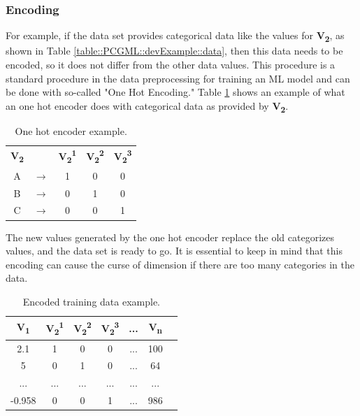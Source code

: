 \documentclass[MGS,Master,english]{twbook}%
\begin{document}
\subsubsection{Encoding}
For example, if the data set provides categorical data like the values for \textbf{V\textsubscript{2}}, as shown in Table \ref{table::PCGML::devExample::data}, then this data needs to be encoded, so it does not differ from the other data values. This procedure is a standard procedure in the data preprocessing for training an ML model and can be done with so-called "One Hot Encoding." Table \ref{table::PCGML::devExample::oneHotEncoder} shows an example of what an one hot encoder does with categorical data as provided by \textbf{V\textsubscript{2}}. 
\begin{table}[!ht]
	\centering
	\begin{tabular}{|c|c|c|c|c|}
		\cline{1-1} \cline{3-5}
		\textbf{V\textsubscript{2}} &  & \textbf{V\textsubscript{2}\textsuperscript{1}} & \textbf{V\textsubscript{2}\textsuperscript{2}} & \textbf{V\textsubscript{2}\textsuperscript{3}} \\ \hhline{=~===}
		A           & $\longrightarrow$         & 1           & 0           & 0           \\ \cline{1-1} \cline{3-5} 
		B           & $\longrightarrow$         & 0           & 1           & 0           \\ \cline{1-1} \cline{3-5} 
		C           & $\longrightarrow$         & 0           & 0           & 1           \\ \cline{1-1} \cline{3-5} 
	\end{tabular}
	\caption{One hot encoder example.}
	\label{table::PCGML::devExample::oneHotEncoder}
\end{table}
The new values generated by the one hot encoder replace the old categorizes values, and the data set is ready to go. It is essential to keep in mind that this encoding can cause the curse of dimension if there are too many categories in the data.
\begin{table}[!ht]
	\centering
	\begin{tabular}{|c|c|c|c|c|c|c|}
		\hline
		\textbf{V\textsubscript{1}} & \textbf{V\textsubscript{2}\textsuperscript{1}}& \textbf{V\textsubscript{2}\textsuperscript{2}}& \textbf{V\textsubscript{2}\textsuperscript{3}} & \textbf{...} & \textbf{V\textsubscript{n}} \\ \hline\hline
		2.1         & 1   & 0   & 0       & ...          & 100         \\ \hline
		5           & 0   & 1   & 0       & ...          & 64          \\ \hline
		...         & ... & ... & ...     & ...          & ...         \\ \hline
		-0.958      & 0   & 0   & 1       & ...          & 986         \\ \hline
	\end{tabular}
	\caption{Encoded training data example.}
	\label{table::PCGML::devExample::data_encoded}
\end{table}
\end{document}
